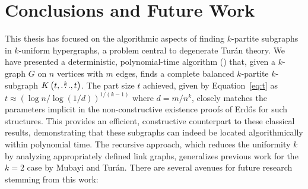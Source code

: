 \section{Conclusions and Future Work}\label{sec:conclusions}

This thesis has focused on the algorithmic aspects of finding $k$-partite subgraphs in $k$-uniform hypergraphs,
a problem central to degenerate Turán theory.
We have presented a deterministic,
polynomial-time algorithm () that, given a $k$-graph $G$ on $n$ vertices with $m$ edges,
finds a complete balanced $k$-partite $k$-subgraph $K\left(t, \overset{k}{\dots}, t\right)$.
The part size $t$ achieved, given by Equation~\eqref{eq:t} as $t \approx (\log n / \log(1/d))^{1/(k-1)}$ where $d=m/n^k$,
closely matches the parameters implicit in the non-constructive existence proofs of Erd\H{o}s for such structures.
This provides an efficient, constructive counterpart to these classical results,
demonstrating that these subgraphs can indeed be located algorithmically within polynomial time.
The recursive approach, which reduces the uniformity $k$ by analyzing appropriately defined link graphs,
generalizes previous work for the $k=2$
case by Mubayi and Turán.
There are several avenues for future research stemming from this work:

